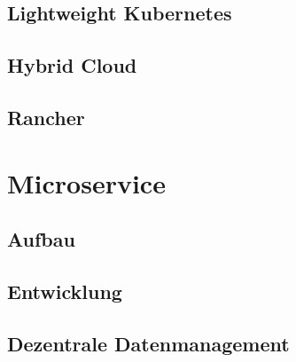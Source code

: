 \subsection{Lightweight Kubernetes}
\subsection{Hybrid Cloud}
\subsection{Rancher}

\section{Microservice}
\subsection{Aufbau}
\subsection{Entwicklung}
\subsection{Dezentrale Datenmanagement}





